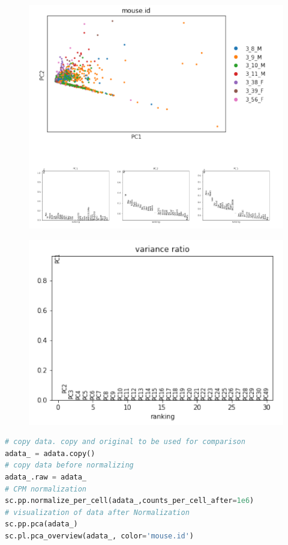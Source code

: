\documentclass{article}
\begin{document}
\begin{figure}
    \centering
    \includegraphics{4.png}
  \end{figure}
  \begin{figure}
    \centering
    \includegraphics{5.png}
  \end{figure}
  \newpage
  \begin{lstlisting}[language=python]
  # copy data. copy and original to be used for comparison
adata_ = adata.copy()
# copy data before normalizing
adata_.raw = adata_
# CPM normalization
sc.pp.normalize_per_cell(adata_,counts_per_cell_after=1e6)
# visualization of data after Normalization
sc.pp.pca(adata_)
sc.pl.pca_overview(adata_, color='mouse.id')
  \end{lstlisting}
  
\end{document}
